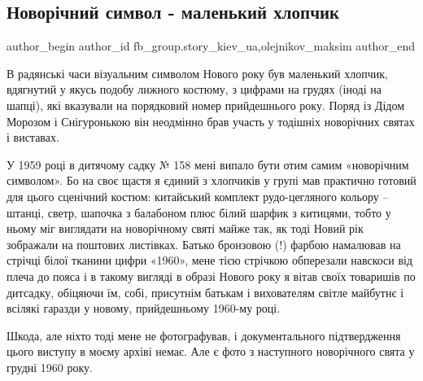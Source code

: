  
 
 
 
 
 
\subsection{Новорічний символ - маленький хлопчик}
\label{sec:27_12_2021.fb.fb_group.story_kiev_ua.2.novyj_god_malchik}
 
\ifcmt
 author_begin
   author_id fb_group.story_kiev_ua,olejnikov_maksim
 author_end
\fi

В радянські часи візуальним символом Нового року був маленький хлопчик,
вдягнутий у якусь подобу лижного костюму, з цифрами на грудях (іноді на шапці),
які вказували на порядковий номер прийдешнього року. Поряд із Дідом Морозом і
Снігуронькою він неодмінно брав участь у тодішніх новорічних святах і виставах.

У 1959 році в дитячому садку № 158 мені випало бути отим самим «новорічним
символом». Бо на своє щастя я єдиний з хлопчиків у групі мав практично готовий
для цього сценічний костюм: китайський комплект рудо-цегляного кольору –
штанці, светр, шапочка з балабоном плюс білий шарфик з китицями, тобто у ньому
міг виглядати на новорічному святі майже так, як тоді Новий рік зображали на
поштових листівках. Батько бронзовою (!) фарбою намалював на стрічці білої
тканини цифри «1960», мене тією стрічкою обперезали навскоси від плеча до пояса
і в такому вигляді в образі Нового року я вітав своїх товаришів по дитсадку,
обіцяючи їм, собі, присутнім батькам і вихователям  світле майбутнє і всілякі
гаразди у новому, прийдешньому 1960-му році. 

Шкода, але ніхто тоді мене не фотографував, і документального підтвердження
цього виступу в моєму архіві немає. Але є фото з наступного новорічного свята у
грудні 1960 року. 

